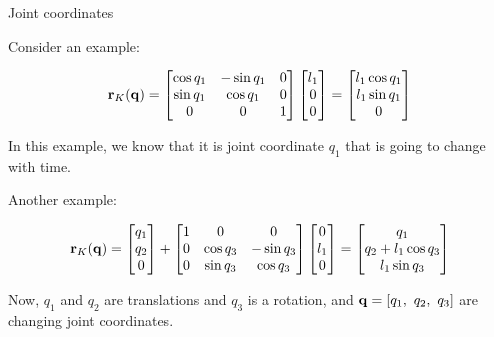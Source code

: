 \documentclass{beamer}
\begin{document}
\begin{frame}{Joint coordinates}
	\begin{flushleft}
		
		Consider an example:
		
		\begin{equation}
			\mathbf{r}_K(\mathbf{q}) = 
			\begin{bmatrix}
				\cos q_1 & -\sin q_1 & 0 \\
				\sin q_1 & \cos q_1 & 0 \\
				0 & 0 & 1
			\end{bmatrix}
			\begin{bmatrix}
				l_1 \\
				0 \\
				0
			\end{bmatrix} = 
				\begin{bmatrix}
					l_1 \cos q_1 \\
					l_1 \sin q_1 \\
					0
				\end{bmatrix}
		\end{equation}
		
		In this example, we know that it is joint coordinate $q_1$ that is going to change with time.
		
		\bigskip
		
		Another example:
		
		\begin{equation*}
			\mathbf{r}_K(\mathbf{q}) = 
			\begin{bmatrix}
				q_1 \\
				q_2 \\
				0
			\end{bmatrix}
		+
			\begin{bmatrix}
					1 & 0 & 0 \\
					0 & \cos q_3 & -\sin q_3 \\
					0 & \sin q_3 & \cos q_3 
			\end{bmatrix}
			\begin{bmatrix}
				0 \\
				l_1 \\
				0
			\end{bmatrix} = 
			\begin{bmatrix}
				q_1 \\
				q_2 + l_1 \cos q_3 \\
				l_1 \sin q_3
			\end{bmatrix}
		\end{equation*}
		
		Now, $q_1$ and $q_2$ are translations and  $q_3$ is a rotation, and $\bo{q} = [q_1, \ q_2, \ q_3]$ are changing joint coordinates.
		
	\end{flushleft}
\end{frame}
\end{document}

